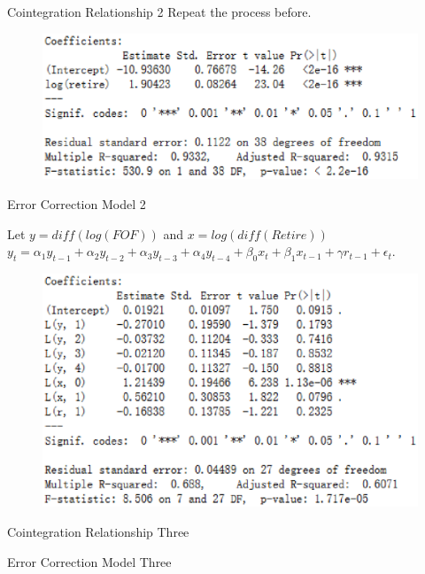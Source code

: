 \documentclass{beamer}
\begin{document}
\begin{frame}{Cointegration Relationship 2}
	Repeat the process before.
	\begin{figure}
		\includegraphics[scale = 0.4]{3-2-lm.eps}
	\end{figure}
\end{frame}


\begin{frame}{Error Correction Model 2}

	Let $y = diff(log(FOF))$ and $x = log(diff(Retire))$ 
	$y_t = \alpha_1 y_{t-1} + \alpha_2 y_{t-2} + \alpha_3 y_{t-3} + \alpha_4 y_{t-4} + \beta_0 x_t+\beta_1 x_{t-1} + \gamma r_{t-1} + \epsilon_t$.
	\begin{figure}
		\includegraphics[scale = 0.4]{3-2-ecm.eps}
	\end{figure}
\end{frame}


\begin{frame}{Cointegration Relationship Three}
\end{frame}


\begin{frame}{Error Correction Model Three}
\end{frame}
\end{document}
